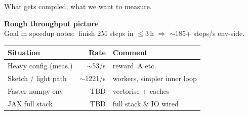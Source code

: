 \documentclass[11pt,aspectratio=43]{beamer}
\begin{document}

\begin{frame}{What gets compiled; what we want to measure.}

  \vspace{1em}
  \centering
  \footnotesize\textbf{Rough throughput picture}\\[0.35em]
  {\scriptsize
    Goal in speedup notes:\ finish 2M steps in \(\le\)3\,h \(\Rightarrow\) \(\sim\)185+ steps/s env-side.}
  \\[0.6em]

  {\footnotesize
    \renewcommand{\arraystretch}{1.15}
    \begin{tabular}{@{}>{\raggedright\arraybackslash}p{}
                    r
                    >{\raggedright\arraybackslash}p{}@{}}
      \toprule
      Situation & Rate & Comment \\
      \midrule
      Heavy config (meas.) & \(\sim\)53/s & reward~A etc.\\
      Sketch / light path & \(\sim\)1221/s & 32 workers, simpler inner loop\\
      Faster numpy env & TBD & vectorise + caches\\
      JAX full stack & TBD & full stack \& IO wired \\
      \bottomrule
    \end{tabular}
  \par}

\end{frame}


%
%
\end{document}
